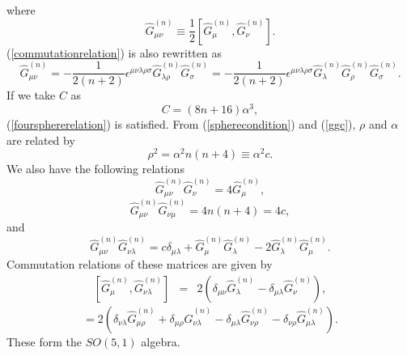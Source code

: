 \documentclass[a4paper,11pt]{article}
\begin{document}
where  
\begin{equation}
\hat{G}_{\mu\nu}^{(n)} \equiv \frac{1}{2}
[\hat{G}_{\mu}^{(n)},\hat{G}_{\nu}^{(n)}]. 
\label{GGcomm}
\end{equation}
(\ref{commutationrelation}) is also rewritten as 
\begin{equation}
\hat{G}_{\mu\nu}^{(n)}=-\frac{1}{2(n+2)}
\epsilon^{\mu\nu\lambda\rho\sigma}\hat{G}_{\lambda\rho}^{(n)}
\hat{G}_{\sigma}^{(n)}
=-\frac{1}{2(n+2)}\epsilon^{\mu\nu\lambda\rho\sigma}
\hat{G}_{\lambda}^{(n)}
\hat{G}_{\rho}^{(n)}\hat{G}_{\sigma}^{(n)}. 
\end{equation}
If we take $C$ as 
\begin{equation}
C=(8n+16)\alpha^{3}, 
\end{equation}
(\ref{foursphererelation}) is satisfied. From 
(\ref{spherecondition}) and (\ref{ggc}), 
$\rho$ and $\alpha$ are related by 
\begin{equation}
\rho^{2}=\alpha^{2}n(n+4)\equiv \alpha^{2} c. 
\end{equation}
We also have the following relations 
\begin{equation}
\hat{G}_{\mu\nu}^{(n)}\hat{G}_{\nu}^{(n)}
=4\hat{G}_{\mu}^{(n)}, 
\label{relationggg}
\end{equation}
\begin{equation}
\hat{G}_{\mu\nu}^{(n)}\hat{G}_{\nu\mu}^{(n)}=4n(n+4)=4c, 
\label{GijGji}
\end{equation} 
and
\begin{equation}
\hat{G}_{\mu\nu}^{(n)}\hat{G}_{\nu\lambda}^{(n)}
=c\delta_{\mu\lambda}
+\hat{G}_{\mu}^{(n)}\hat{G}_{\lambda}^{(n)}
-2\hat{G}_{\lambda}^{(n)}\hat{G}_{\mu}^{(n)}. 
\label{ggcgg}
\end{equation}
Commutation relations of these matrices are given by 
\begin{eqnarray} 
[\hat{G}_{\mu}^{(n)},\hat{G}_{\nu\lambda}^{(n)}]&=&2\left(
\delta_{\mu\nu}\hat{G}_{\lambda}^{(n)}-\delta_{\mu\lambda}
\hat{G}_{\nu}^{(n)}
\right), 
\label{commurelation}
\end{eqnarray}
\begin{equation}
[\hat{G}_{\mu\nu}^{(n)},\hat{G}_{\lambda\rho}^{(n)}]=2\left(
\delta_{\nu\lambda}\hat{G}_{\mu\rho}^{(n)}
+\delta_{\mu\rho}\hat{G}_{\nu\lambda}^{(n)}
-\delta_{\mu\lambda}\hat{G}_{\nu\rho}^{(n)}
-\delta_{\nu\rho}\hat{G}_{\mu\lambda}^{(n)}
\right). 
\label{commurelation2}
\end{equation}
These form the $SO(5,1)$ algebra. 
\end{document}
